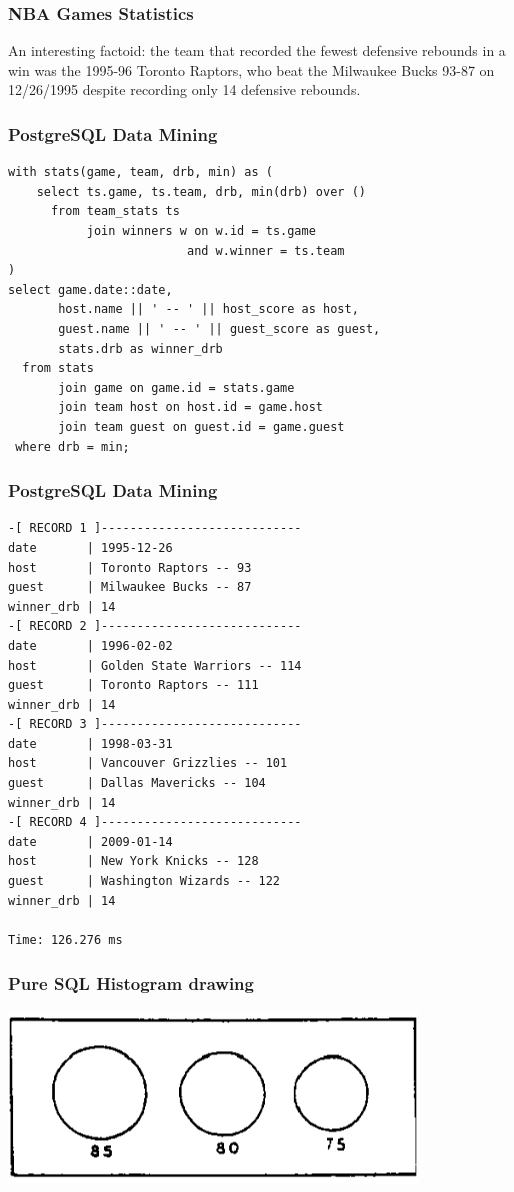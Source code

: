 \documentclass{beamer}
\begin{document}
\begin{frame}
  \frametitle{NBA Games Statistics}

  An interesting factoid: the team that recorded the fewest defensive
  rebounds in a win was the 1995-96 Toronto Raptors, who beat the Milwaukee
  Bucks 93-87 on 12/26/1995 despite recording only 14 defensive rebounds.
\end{frame}

\begin{frame}[fragile]
  \frametitle{PostgreSQL Data Mining}

\begin{verbatim}
with stats(game, team, drb, min) as (
    select ts.game, ts.team, drb, min(drb) over ()
      from team_stats ts
           join winners w on w.id = ts.game
                         and w.winner = ts.team
)
select game.date::date,
       host.name || ' -- ' || host_score as host,
       guest.name || ' -- ' || guest_score as guest,
       stats.drb as winner_drb
  from stats
       join game on game.id = stats.game
       join team host on host.id = game.host
       join team guest on guest.id = game.guest
 where drb = min;
\end{verbatim}
\end{frame}

\begin{frame}[fragile]
  \frametitle{PostgreSQL Data Mining}

\begin{verbatim}
-[ RECORD 1 ]----------------------------
date       | 1995-12-26
host       | Toronto Raptors -- 93
guest      | Milwaukee Bucks -- 87
winner_drb | 14
-[ RECORD 2 ]----------------------------
date       | 1996-02-02
host       | Golden State Warriors -- 114
guest      | Toronto Raptors -- 111
winner_drb | 14
-[ RECORD 3 ]----------------------------
date       | 1998-03-31
host       | Vancouver Grizzlies -- 101
guest      | Dallas Mavericks -- 104
winner_drb | 14
-[ RECORD 4 ]----------------------------
date       | 2009-01-14
host       | New York Knicks -- 128
guest      | Washington Wizards -- 122
winner_drb | 14

Time: 126.276 ms
\end{verbatim}
\end{frame}

\begin{frame}
  \frametitle{Pure SQL Histogram drawing}

  \begin{center}
    \includegraphics[height=1.8in]{histogram.png}
  \end{center}
\end{frame}
\end{document}
